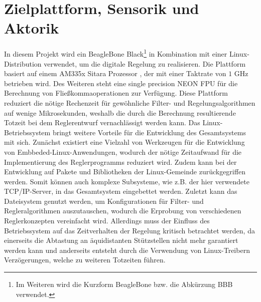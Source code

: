 \section{Zielplattform, Sensorik und Aktorik}
In diesem Projekt wird ein BeagleBone Black\footnote{Im Weiteren wird die Kurzform BeagleBone bzw. die Abkürzung BBB verwendet.} \cite{BBBSRM} in Kombination mit einer Linux-Distribution verwendet, um die digitale Regelung zu realisieren. Die Plattform basiert auf einem AM335x Sitara  Prozessor \cite{AM335x}, der mit einer Taktrate von $1\text{ GHz}$ betrieben wird. Des Weiteren steht eine single precision NEON FPU für die Berechnung von Fließkommaoperationen zur Verfügung. Diese Plattform reduziert die nötige Rechenzeit für gewöhnliche Filter- und Regelungsalgorithmen auf wenige Mikrosekunden, weshalb die durch die Berechnung resultierende Totzeit bei dem Reglerentwurf vernachlässigt werden kann.
Das Linux-Betriebssystem bringt weitere Vorteile für die Entwicklung des Gesamtsystems mit sich. Zunächst existiert eine Vielzahl von Werkzeugen für die Entwicklung von Embbeded-Linux-Anwendungen, wodurch der nötige Zeitaufwand für die Implementierung des Reglerprogramms reduziert wird.  Zudem kann bei der Entwicklung auf Pakete und Bibliotheken der Linux-Gemeinde zurückgegriffen werden. Somit können auch komplexe Subsysteme, wie z.B. der hier verwendete TCP/IP-Server, in das Gesamtsystem eingebettet werden. Zuletzt kann das Dateisystem genutzt werden, um Konfigurationen für Filter- und Regleralgorithmen auszutauschen, wodurch die Erprobung von verschiedenen Reglerkonzepten vereinfacht wird. 
Allerdings muss der Einfluss des Betriebssystem auf das Zeitverhalten der Regelung kritisch betrachtet werden, da einerseits die Abtastung an äquidistanten Stützstellen nicht mehr garantiert werden kann und anderseits entsteht durch die Verwendung von Linux-Treibern Verzögerungen, welche zu weiteren Totzeiten führen.

